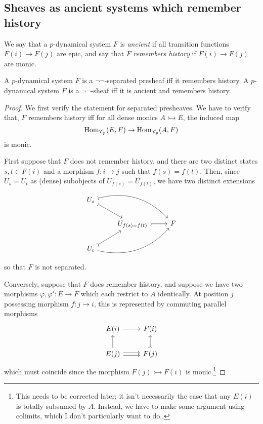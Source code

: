 \documentclass{amsart}
\begin{document}
\subsection{Sheaves as ancient systems which remember history}
We say that a $p$-dynamical system $F$ is \emph{ancient} if all transition functions $F(i) \rightarrow F(j)$ are epic, and say that $F$ \emph{remembers history} if $F(i) \rightarrow F(j)$ are monic.
\begin{proposition}
  A $p$-dynamical system $F$ is a $\neg\neg$-separated presheaf iff it remembers history.
  A $p$-dynamical system $F$ is a $\neg\neg$-sheaf iff it is ancient and remembers history.
\end{proposition}
\begin{proof}
  We first verify the statement for separated presheaves.
  We have to verify that, $F$ remembers history iff for all dense monics $A \rightarrowtail E$, the induced map
  \[
    \operatorname{Hom}_{\mathscr{C}_p}(E,F) \rightarrow \operatorname{Hom}_{\mathscr{C}_p}(A,F)
  \]
  is monic.

  First suppose that $F$ does not remember history, and there are two distinct states $s,t \in F(i)$ and a morphism $f:i \rightarrow j$ such that $f(s) = f(t)$.
  Then, since $U_s = U_t$ as (dense) subobjects of $U_{f(s)} = U_{f(t)}$, we have two distinct extensions
  \[
    \begin{tikzcd}
      U_{s} \arrow[rd,tail] \arrow[rrd,tail, bend left]\\
      & U_{f(s) = f(t)} \arrow[r,tail]& F\\
      U_{t} \arrow[ru,tail] \arrow[rru, bend right]
    \end{tikzcd}
  \]
  so that $F$ is not separated.

  Conversely, suppose that $F$ does remember history, and suppose we have two morphisms $\varphi,\varphi':E \rightarrow F$ which each restrict to $A$ identically.
  At position $j$ possessing morphism $f:j \rightarrow i$, this is represented by commuting parallel morphisms 
  \[
    \begin{tikzcd}
      E(i) \arrow[r]
      & F(i)\\
      E(j) \arrow[u] \arrow[r, transform canvas={yshift = .4ex}]  \arrow[r, transform canvas={yshift = -.4ex}]
      & F(j) \arrow[u,tail]
    \end{tikzcd}
  \]
  which must coincide since the morphism $F(j) \rightarrowtail F(i)$ is monic.\footnote{\color{magenta} This needs to be corrected later;
it isn't necessarily the case that any $E(i)$ is totally subsumed by $A$.
Instead, we have to make some argument using colimits, which I don't particularly want to do..}


\end{proof}
\end{document}
